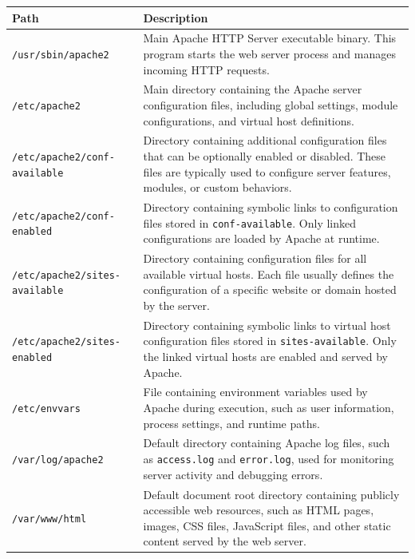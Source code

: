 \documentclass{scrbook}
\begin{document}
	\begin{table}[!h]
		\centering
		\tiny
		\begin{tabularx}{\linewidth}{|p{17em}|X|}
			\hline
			\textbf{Path} & \textbf{Description} \\
			\hline
			
			\texttt{/usr/sbin/apache2} & Main Apache HTTP Server executable binary. This program starts the web server process and manages incoming HTTP requests.\\
			\hline
			
			\texttt{/etc/apache2} & Main directory containing the Apache server configuration files, including global settings, module configurations, and virtual host definitions.\\
			\hline
			
			\texttt{/etc/apache2/conf-available} & Directory containing additional configuration files that can be optionally enabled or disabled. These files are typically used to configure server features, modules, or custom behaviors.\\
			\hline
			
			\texttt{/etc/apache2/conf-enabled} & Directory containing symbolic links to configuration files stored in \texttt{conf-available}. Only linked configurations are loaded by Apache at runtime.\\
			\hline
			
			\texttt{/etc/apache2/sites-available} & Directory containing configuration files for all available virtual hosts. Each file usually defines the configuration of a specific website or domain hosted by the server.\\
			\hline
			
			\texttt{/etc/apache2/sites-enabled} & Directory containing symbolic links to virtual host configuration files stored in \texttt{sites-available}. Only the linked virtual hosts are enabled and served by Apache.\\
			\hline
			
			\texttt{/etc/envvars} & File containing environment variables used by Apache during execution, such as user information, process settings, and runtime paths.\\
			\hline
			
			\texttt{/var/log/apache2} & Default directory containing Apache log files, such as \texttt{access.log} and \texttt{error.log}, used for monitoring server activity and debugging errors.\\
			\hline
			
			\texttt{/var/www/html} & Default document root directory containing publicly accessible web resources, such as HTML pages, images, CSS files, JavaScript files, and other static content served by the web server.\\
			\hline
			
		\end{tabularx}
	\end{table}
	
\end{document}
